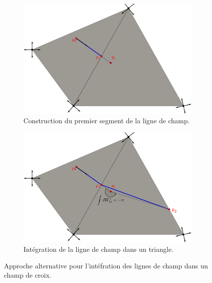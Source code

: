 \begin{figure}[!h]
     \centering
     \begin{subfigure}[b]{0.7\textwidth}
         \centering
         \includegraphics[width=\textwidth]{images/draw_streams_21.pdf}
         \caption{Construction du premier segment de la ligne de champ.}
     \end{subfigure}
     \begin{subfigure}[b]{0.7\textwidth}
         \centering
         \includegraphics[width=\textwidth]{images/draw_streams_22.pdf}
         \caption{Intégration de la ligne de champ dans un triangle.}
     \end{subfigure}
        \caption{Approche alternative pour l'intéfration des lignes de champ dans un champ de croix.}
        \label{fig:draw_streams_2}
\end{figure}



